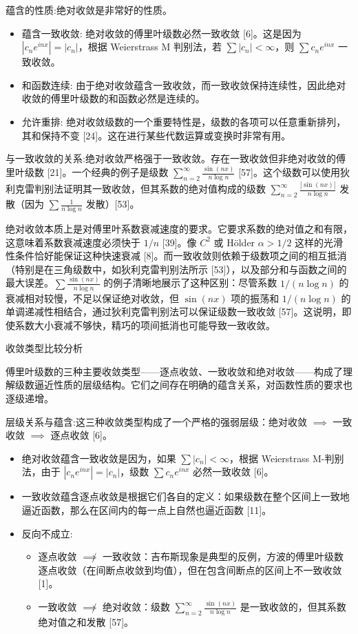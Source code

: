 蕴含的性质:绝对收敛是非常好的性质。

\begin{itemize}
	\item 蕴含一致收敛: 绝对收敛的傅里叶级数必然一致收敛 [6]。这是因为 $|c_ne^{inx}|=|c_n|$，根据 Weierstrass M 判别法，若 $\sum|c_n|<\infty$，则 $\sum c_ne^{inx}$ 一致收敛。
	\item 和函数连续: 由于绝对收敛蕴含一致收敛，而一致收敛保持连续性，因此绝对收敛的傅里叶级数的和函数必然是连续的。
	\item 允许重排: 绝对收敛级数的一个重要特性是，级数的各项可以任意重新排列，其和保持不变 [24]。这在进行某些代数运算或变换时非常有用。
\end{itemize}

与一致收敛的关系:绝对收敛严格强于一致收敛。存在一致收敛但非绝对收敛的傅里叶级数 [21]。一个经典的例子是级数 $\sum_{n=2}^\infty \frac{\sin(nx)}{n\log n}$ [57]。这个级数可以使用狄利克雷判别法证明其一致收敛，但其系数的绝对值构成的级数 $\sum_{n=2}^\infty \frac{|\sin(nx)|}{n\log n}$ 发散（因为 $\sum \frac{1}{n\log n}$ 发散）[53]。

绝对收敛本质上是对傅里叶系数衰减速度的要求。它要求系数的绝对值之和有限，这意味着系数衰减速度必须快于 $1/n$ [39]。像 $C^2$ 或 Hölder $\alpha>1/2$ 这样的光滑性条件恰好能保证这种快速衰减 [8]。而一致收敛则依赖于级数项之间的相互抵消（特别是在三角级数中，如狄利克雷判别法所示 [53]），以及部分和与函数之间的最大误差。$\sum \frac{\sin(nx)}{n\log n}$ 的例子清晰地展示了这种区别：尽管系数 $1/(n\log n)$ 的衰减相对较慢，不足以保证绝对收敛，但 $\sin(nx)$ 项的振荡和 $1/(n\log n)$ 的单调递减性相结合，通过狄利克雷判别法可以保证级数一致收敛 [57]。这说明，即使系数大小衰减不够快，精巧的项间抵消也可能导致一致收敛。

收敛类型比较分析

傅里叶级数的三种主要收敛类型——逐点收敛、一致收敛和绝对收敛——构成了理解级数逼近性质的层级结构。它们之间存在明确的蕴含关系，对函数性质的要求也逐级递增。

层级关系与蕴含:这三种收敛类型构成了一个严格的强弱层级：绝对收敛 $\implies$ 一致收敛 $\implies$ 逐点收敛 [6]。

\begin{itemize}
	\item 绝对收敛蕴含一致收敛是因为，如果 $\sum|c_n|<\infty$，根据 Weierstrass M-判别法，由于 $|c_ne^{inx}|=|c_n|$，级数 $\sum c_ne^{inx}$ 必然一致收敛 [6]。
	\item 一致收敛蕴含逐点收敛是根据它们各自的定义：如果级数在整个区间上一致地逼近函数，那么在区间内的每一点上自然也逼近函数 [11]。
	\item 反向不成立:
	\begin{itemize}
		\item 逐点收敛 $\not\implies$ 一致收敛：吉布斯现象是典型的反例，方波的傅里叶级数逐点收敛（在间断点收敛到均值），但在包含间断点的区间上不一致收敛 [1]。
		\item 一致收敛 $\not\implies$ 绝对收敛：级数 $\sum_{n=2}^\infty \frac{\sin(nx)}{n\log n}$ 是一致收敛的，但其系数绝对值之和发散 [57]。
	\end{itemize}
\end{itemize}

